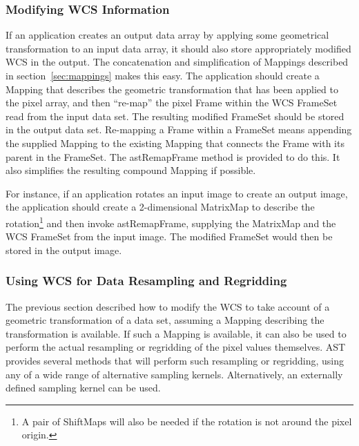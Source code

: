 \documentclass[final,authoryear,5p,times,twocolumn]{elsarticle}
\begin{document}
\subsubsection{Modifying WCS Information}

If an application creates an output data array by applying some geometrical
transformation to an input data array, it should also store appropriately
modified WCS in the output. The concatenation and simplification of
Mappings described in section~\ref{sec:mappings} makes this easy. The
application should create a Mapping that describes the geometric
transformation that has been applied to the pixel array, and then
``re-map'' the pixel Frame within the WCS FrameSet read from the input
data set. The resulting modified FrameSet should be stored in the output
data set. Re-mapping a Frame within a FrameSet means appending the
supplied Mapping to the existing Mapping that connects the Frame with its
parent in the FrameSet. The astRemapFrame method is provided to do this.
It also simplifies the resulting compound Mapping if possible.

For instance, if an application rotates an input image to create an
output image, the application should create a 2-dimensional MatrixMap to
describe the rotation\footnote{A pair of ShiftMaps will also be needed if
the rotation is not around the pixel origin.} and then invoke
astRemapFrame, supplying the MatrixMap and the WCS FrameSet from the
input image. The modified FrameSet would then be stored in the output
image.

\subsubsection{Using WCS for Data Resampling and Regridding}
The previous section described how to modify the WCS to take account of a
geometric transformation of a data set, assuming a Mapping describing the
transformation is available. If such a Mapping is available, it can also
be used to perform the actual resampling or regridding of the pixel
values themselves. AST provides several methods that will perform such
resampling or regridding, using any of a wide range of alternative
sampling kernels. Alternatively, an externally defined sampling kernel
can be used.
\end{document}
